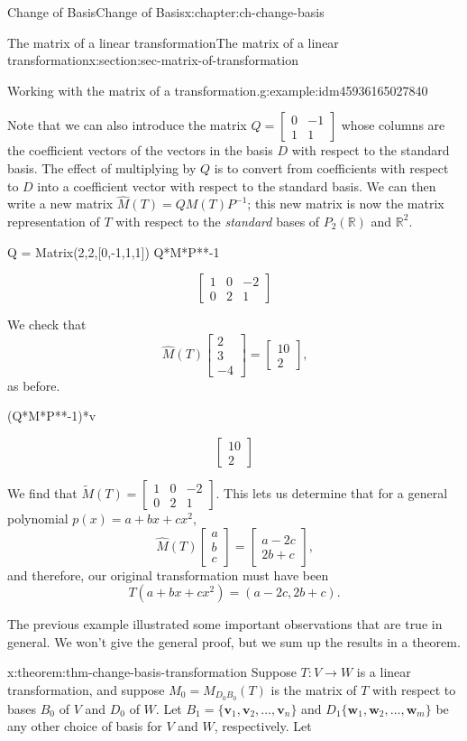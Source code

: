 \documentclass[oneside,10pt,]{book}
\numberwithin{equation}{section}
\newcommand{\bbm}{\begin{bmatrix}}
\newcommand{\ebm}{\end{bmatrix}}
\newcommand{\R}{\mathbb{R}}
\newcommand{\basis}[2]{\{\mathbf{#1}_1,\mathbf{#1}_2,\ldots,\mathbf{#1}_{#2}\}}
\newcommand{\amp}{&}
\begin{document}
\begin{chapterptx}{Change of Basis}{}{Change of Basis}{}{}{x:chapter:ch-change-basis}
\begin{sectionptx}{The matrix of a linear transformation}{}{The matrix of a linear transformation}{}{}{x:section:sec-matrix-of-transformation}
\begin{example}{Working with the matrix of a transformation.}{g:example:idm45936165027840}
\par
Note that we can also introduce the matrix \(Q = \bbm 0\amp -1\\1\amp 1\ebm\) whose columns are the coefficient vectors of the vectors in the basis \(D\) with respect to the standard basis. The effect of multiplying by \(Q\) is to convert from coefficients with respect to \(D\) into a coefficient vector with respect to the standard basis. We can then write a new matrix \(\hat{M}(T) = QM(T)P^{-1}\); this new matrix is now the matrix representation of \(T\) with respect to the \emph{standard} bases of \(P_2(\R)\) and \(\R^2\).%
\begin{sageinput}
Q = Matrix(2,2,[0,-1,1,1])
Q*M*P**-1
\end{sageinput}
\begin{sageoutput}
\[\bbm 1\amp 0\amp -2\\0\amp 2\amp 1\ebm\]
\end{sageoutput}
We check that%
\begin{equation*}
\hat{M}(T)\bbm 2\\3\\-4\ebm = \bbm 10\\2\ebm\text{,}
\end{equation*}
as before.%
\begin{sageinput}
(Q*M*P**-1)*v
\end{sageinput}
\begin{sageoutput}
\[\bbm 10\\2 \ebm\]
\end{sageoutput}
We find that \(\tilde{M}(T) = \bbm 1\amp 0\amp -2\\0\amp 2\amp 1\ebm\). This lets us determine that for a general polynomial \(p(x) = a+bx+cx^2\),%
\begin{equation*}
\hat{M}(T)\bbm a\\b\\c\ebm = \bbm a-2c\\2b+c\ebm\text{,}
\end{equation*}
and therefore, our original transformation must have been%
\begin{equation*}
T(a+bx+cx^2)=(a-2c,2b+c)\text{.}
\end{equation*}
%
\end{example}
The previous example illustrated some important observations that are true in general. We won't give the general proof, but we sum up the results in a theorem.%
\begin{theorem}{}{}{x:theorem:thm-change-basis-transformation}%
Suppose \(T:V\to W\) is a linear transformation, and suppose \(M_0 = M_{D_0B_0}(T)\) is the matrix of \(T\) with respect to bases \(B_0\) of \(V\) and \(D_0\) of \(W\). Let \(B_1=\basis{v}{n}\) and \(D_1\basis{w}{m}\) be any other choice of basis for \(V\) and \(W\), respectively. Let%

\end{theorem}
\end{sectionptx}
\end{chapterptx}
\end{document}
